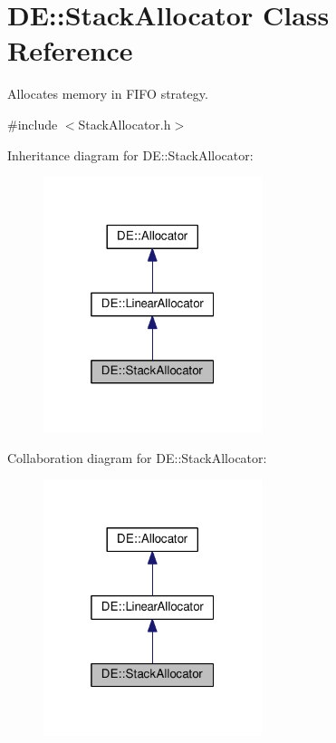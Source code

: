 \hypertarget{classDE_1_1StackAllocator}{}\section{DE\+:\+:Stack\+Allocator Class Reference}
\label{classDE_1_1StackAllocator}


Allocates memory in F\+I\+FO strategy.  




{\ttfamily \#include $<$Stack\+Allocator.\+h$>$}



Inheritance diagram for DE\+:\+:Stack\+Allocator\+:
\nopagebreak
\begin{figure}[H]
\begin{center}
\leavevmode
\includegraphics[width=181pt]{classDE_1_1StackAllocator__inherit__graph}
\end{center}
\end{figure}


Collaboration diagram for DE\+:\+:Stack\+Allocator\+:
\nopagebreak
\begin{figure}[H]
\begin{center}
\leavevmode
\includegraphics[width=181pt]{classDE_1_1StackAllocator__coll__graph}
\end{center}
\end{figure}
